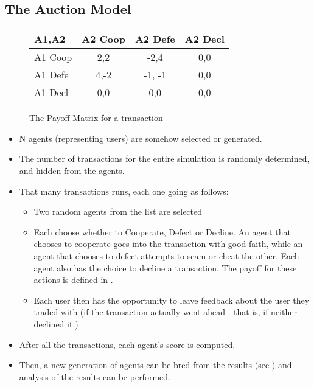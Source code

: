 \documentclass{article}
\begin{document}
\subsection{The Auction Model}
	\begin{figure}
		\label{fig:model-payoff}
		\caption{The Payoff Matrix for a transaction}
		\begin{tabular}{| l || c | c | c |}
			\hline
			A1,A2 & A2 Coop & A2 Defe & A2 Decl \\ \hline
			A1 Coop & 2,2 & -2,4 & 0,0 \\ \hline  
			A1 Defe & 4,-2 & -1, -1 & 0,0 \\ \hline
			A1 Decl & 0,0 & 0,0 & 0,0 \\ \hline
		\end{tabular}
	\end{figure}
\begin{itemize}
	\item N agents (representing users) are somehow selected or generated.
	\item The number of transactions for the entire simulation is randomly determined, and hidden from the agents.
	\item That many transactions runs, each one going as follows:
	\begin{itemize}
		\item Two random agents from the list are selected
		\item Each choose whether to Cooperate, Defect or Decline. An agent that chooses to cooperate goes into the transaction with good faith, while an agent that chooses to defect attempts to scam or cheat the other. Each agent also has the choice to decline a transaction. The payoff for these actions is defined in .
		\item Each user then has the opportunity to leave feedback about the user they traded with (if the transaction actually went ahead - that is, if neither declined it.)
	\end{itemize}
	\item After all the transactions, each agent's score is computed.
	\item Then, a new generation of agents can be bred from the results (see ) and analysis of the results can be performed.
\end{itemize}
\end{document}

